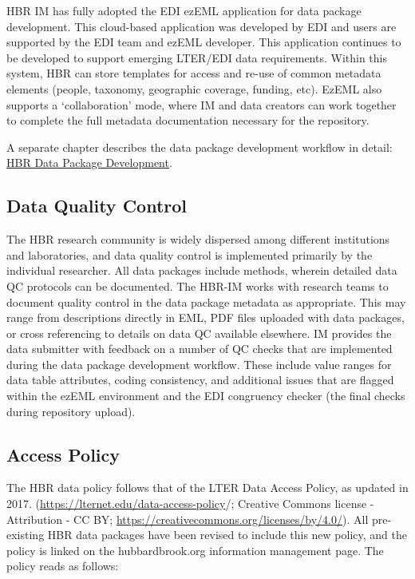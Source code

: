 \documentclass[
  letterpaper,
  DIV=11,
  numbers=noendperiod]{scrreprt}
\begin{document}
HBR IM has fully adopted the EDI ezEML application for data package
development. This cloud-based application was developed by EDI and users
are supported by the EDI team and ezEML developer. This application
continues to be developed to support emerging LTER/EDI data
requirements. Within this system, HBR can store templates for access and
re-use of common metadata elements (people, taxonomy, geographic
coverage, funding, etc). EzEML also supports a `collaboration' mode,
where IM and data creators can work together to complete the full
metadata documentation necessary for the repository.

A separate chapter describes the data package development workflow in
detail: \href{DataPackageWorkflow.qmd}{HBR Data Package Development}.

\subsection{Data Quality Control}\label{data-quality-control}

The HBR research community is widely dispersed among different
institutions and laboratories, and data quality control is implemented
primarily by the individual researcher. All data packages include
methods, wherein detailed data QC protocols can be documented. The
HBR-IM works with research teams to document quality control in the data
package metadata as appropriate. This may range from descriptions
directly in EML, PDF files uploaded with data packages, or cross
referencing to details on data QC available elsewhere. IM provides the
data submitter with feedback on a number of QC checks that are
implemented during the data package development workflow. These include
value ranges for data table attributes, coding consistency, and
additional issues that are flagged within the ezEML environment and the
EDI congruency checker (the final checks during repository upload).

\subsection{Access Policy}\label{access-policy}

The HBR data policy follows that of the LTER Data Access Policy, as
updated in 2017. (\url{https://lternet.edu/data-access-policy}/;
Creative Commons license - Attribution - CC BY;
\url{https://creativecommons.org/licenses/by/4.0/}). All pre-existing
HBR data packages have been revised to include this new policy, and the
policy is linked on the hubbardbrook.org information management page.
The policy reads as follows:
\end{document}
